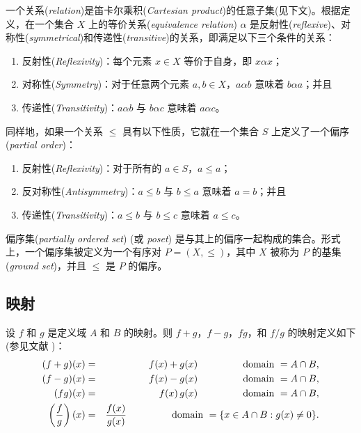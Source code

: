 \documentclass[11pt,fontset=founder]{ctexart}
\begin{document}
一个关系(\emph{relation})是笛卡尔乘积(\emph{Cartesian product})的任意子集(见下文)。根据定义，在一个集合 $X$ 上的等价关系(\emph{equivalence relation}) $\alpha$ 是反射性(\emph{reflexive})、对称性(\emph{symmetrical})和传递性(\emph{transitive})的关系，即满足以下三个条件的关系：

\begin{enumerate}
\item 反射性(\emph{Reflexivity})：每个元素 $x\in X$ 等价于自身，即 $x\alpha x$；

\item 对称性(\emph{Symmetry})：对于任意两个元素 $a,b\in X$，$a\alpha b$ 意味着 $b\alpha a$；并且

\item 传递性(\emph{Transitivity})：$a\alpha b$ 与 $b\alpha c$ 意味着 $a\alpha c$。
\end{enumerate}

同样地，如果一个关系 $\leq $ 具有以下性质，它就在一个集合 $S$ 上定义了一个偏序(\emph{partial order})：

\begin{enumerate}
\item 反射性(\emph{Reflexivity})：对于所有的 $a\in S$，$a\leq a$；

\item 反对称性(\emph{Antisymmetry})：$a\leq b$ 与 $b\leq a$ 意味着 $a=b$；并且

\item 传递性(\emph{Transitivity})：$a\leq b$ 与 $b\leq c$ 意味着 $a\leq c$。
\end{enumerate}

偏序集(\emph{partially ordered set}) (或 \emph{poset}) 是与其上的偏序一起构成的集合。形式上，一个偏序集被定义为一个有序对 $P=(X,\leq )$，其中 $X$ 被称为 $P$ 的基集(\emph{ground set})，并且 $\leq $ 是 $P$ 的偏序。

\subsection{映射}

设 $f$ 和 $g$ 是定义域 $A$ 和 $B$ 的映射。则 $f+g$，$f-g$，$fg$，和 $f/g$ 的映射定义如下(参见文献 \cite{GaneshSprBig,GaneshADG})：
\begin{eqnarray*}
(f+g)(x) &=&f(x)+g(x)\text{ \ \ \ \ \ \ \ \ \ \ \ domain }=A\cap B, \\
(f-g)(x) &=&f(x)-g(x)\text{ \ \ \ \ \ \ \ \ \ \ \ domain }=A\cap B, \\
(fg)(x) &=&f(x)\,g(x)\text{ \ \ \ \ \ \ \ \ \ \ \ domain }=A\cap B, \\
\left( \frac{f}{g}\right) (x) &=&\frac{f(x)}{g(x)}\text{ \ \ \ \ \ \ \ \ \ \
\ domain }=\{x\in A\cap B:g(x)\neq 0\}.
\end{eqnarray*}
\end{document}
